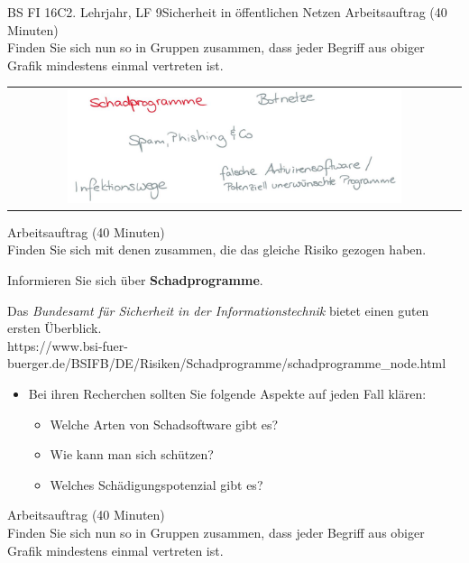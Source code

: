 \documentclass[oneside,openany,headings=optiontotoc,11pt,numbers=noenddot]{scrreprt}
\begin{document}
\begin{worksheet}{BS FI 16C}{2. Lehrjahr, LF 9}{Sicherheit in öffentlichen Netzen}
		\color{codegray}Arbeitsauftrag (40 Minuten)\\
		\color{black}
		Finden Sie sich nun so in Gruppen zusammen, dass jeder Begriff aus obiger Grafik mindestens einmal vertreten ist.
	
		\newpage
		\setcounter{page}{1}
		\begin{framed}
			\begin{tabular}{lcr}
				& \includegraphics[width=0.8\textwidth]{Bilder/Schadprogramme.jpg} & \\
			\end{tabular}
		\end{framed}
		\color{codegray}Arbeitsauftrag (40 Minuten)\\
		\color{black}
		Finden Sie sich mit denen zusammen, die das gleiche Risiko gezogen haben.
		\par
		\bigskip
		\noindent
		Informieren Sie sich über \textbf{Schadprogramme}.
		\par\bigskip\noindent
		Das \textit{Bundesamt für Sicherheit in der Informationstechnik} bietet einen guten ersten Überblick.\\
		\small{\color{codegray}https://www.bsi-fuer-buerger.de/BSIFB/DE/Risiken/Schadprogramme/schadprogramme\_node.html}
		\normalsize
		\begin{itemize}
			\item[] Bei ihren Recherchen sollten Sie folgende Aspekte auf jeden Fall klären:
			\begin{itemize}
				\item Welche Arten von Schadsoftware gibt es?
				\item Wie kann man sich schützen?
				\item Welches Schädigungspotenzial gibt es?
			\end{itemize}
		\end{itemize}
		\par
		\bigskip
		\noindent
		
		\color{codegray}Arbeitsauftrag (40 Minuten)\\
		\color{black}
		Finden Sie sich nun so in Gruppen zusammen, dass jeder Begriff aus obiger Grafik mindestens einmal vertreten ist.
	

\end{worksheet}
\end{document}
